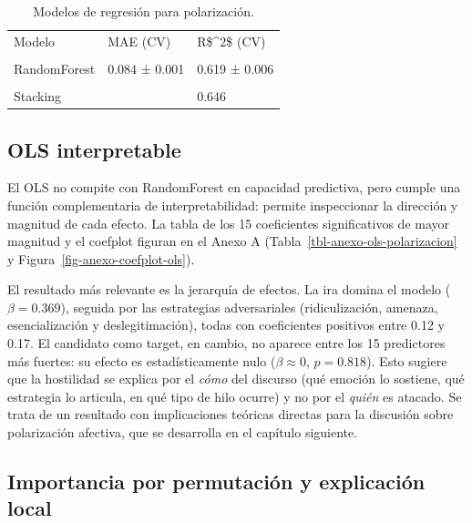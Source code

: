 \documentclass[
  letterpaper,
  numbers=noendperiod,
  fontsize=11pt,
  DIV=12,
  titlepage=false]{scrreprt}
\begin{document}
\begin{longtable}[t]{lll}

\caption{\label{tbl-cv-regresion}Modelos de regresión para
polarización.}

\tabularnewline

\\
\toprule
Modelo & MAE (CV) & R\$\textasciicircum{}2\$ (CV)\\
\midrule
\cellcolor{gray!10}{Ridge} & \cellcolor{gray!10}{0.098 ± 0.001} & \cellcolor{gray!10}{0.553 ± 0.006}\\
RandomForest & 0.084 ± 0.001 & 0.619 ± 0.006\\
\cellcolor{gray!10}{GBM} & \cellcolor{gray!10}{0.108 ± 0.002} & \cellcolor{gray!10}{0.474 ± 0.011}\\
Stacking &  & 0.646\\
\bottomrule

\end{longtable}

\subsection{OLS interpretable}\label{ols-interpretable}

El OLS no compite con RandomForest en capacidad predictiva, pero cumple
una función complementaria de interpretabilidad: permite inspeccionar la
dirección y magnitud de cada efecto. La tabla de los 15 coeficientes
significativos de mayor magnitud y el coefplot figuran en el Anexo A
(Tabla~\ref{tbl-anexo-ols-polarizacion} y
Figura~\ref{fig-anexo-coefplot-ols}).

El resultado más relevante es la jerarquía de efectos. La ira domina el
modelo (\(\beta = 0.369\)), seguida por las estrategias adversariales
(ridiculización, amenaza, esencialización y deslegitimación), todas con
coeficientes positivos entre 0.12 y 0.17. El candidato como target, en
cambio, no aparece entre los 15 predictores más fuertes: su efecto es
estadísticamente nulo (\(\beta \approx 0\), \(p = 0.818\)). Esto sugiere
que la hostilidad se explica por el \emph{cómo} del discurso (qué
emoción lo sostiene, qué estrategia lo articula, en qué tipo de hilo
ocurre) y no por el \emph{quién} es atacado. Se trata de un resultado
con implicaciones teóricas directas para la discusión sobre polarización
afectiva, que se desarrolla en el capítulo siguiente.

\subsection{Importancia por permutación y explicación
local}\label{importancia-por-permutaciuxf3n-y-explicaciuxf3n-local}
\end{document}
